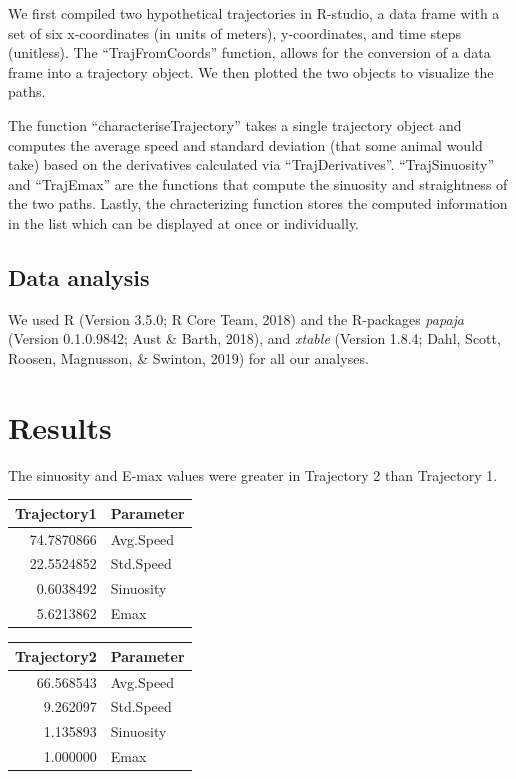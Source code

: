 \documentclass[man]{apa6}
\begin{document}
We first compiled two hypothetical trajectories in R-studio, a data
frame with a set of six x-coordinates (in units of meters),
y-coordinates, and time steps (unitless). The \enquote{TrajFromCoords}
function, allows for the conversion of a data frame into a trajectory
object. We then plotted the two objects to visualize the paths.

The function \enquote{characteriseTrajectory} takes a single trajectory
object and computes the average speed and standard deviation (that some
animal would take) based on the derivatives calculated via
\enquote{TrajDerivatives}. \enquote{TrajSinuosity} and
\enquote{TrajEmax} are the functions that compute the sinuosity and
straightness of the two paths. Lastly, the chracterizing function stores
the computed information in the list which can be displayed at once or
individually.

\subsection{Data analysis}\label{data-analysis}

We used R (Version 3.5.0; R Core Team, 2018) and the R-packages
\emph{papaja} (Version 0.1.0.9842; Aust \& Barth, 2018), and
\emph{xtable} (Version 1.8.4; Dahl, Scott, Roosen, Magnusson, \&
Swinton, 2019) for all our analyses.

\section{Results}\label{results}

The sinuosity and E-max values were greater in Trajectory 2 than
Trajectory 1.

\begin{tabular}{r|l}
\hline
Trajectory1 & Parameter\\
\hline
74.7870866 & Avg.Speed\\
\hline
22.5524852 & Std.Speed\\
\hline
0.6038492 & Sinuosity\\
\hline
5.6213862 & Emax\\
\hline
\end{tabular}

\begin{tabular}{r|l}
\hline
Trajectory2 & Parameter\\
\hline
66.568543 & Avg.Speed\\
\hline
9.262097 & Std.Speed\\
\hline
1.135893 & Sinuosity\\
\hline
1.000000 & Emax\\
\hline
\end{tabular}
\end{document}
